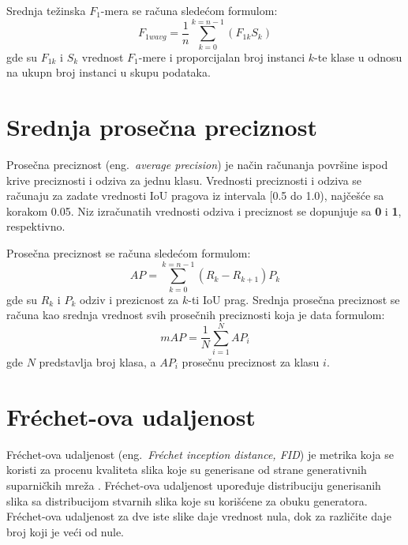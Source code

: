 \documentclass[12pt,oneside]{memoir}
\begin{document}
Srednja težinska $F_1$-mera se računa sledećom formulom:
\begin{equation}
\label{eq:f1wa}
    F_{1wavg} = \frac{1}{n}\sum_{k=0}^{k=n-1} (F_{1k} S_{k})
\end{equation}
gde su \(F_{1k}\) i \(S_{k}\) vrednost $F_1$-mere i proporcijalan broj instanci \(k\)-te klase u odnosu na ukupn broj instanci u skupu podataka.

\section{Srednja prosečna preciznost}
\label{section4_avgprecision}

Prosečna preciznost (eng.~\textit{average precision}) je način računanja površine ispod krive preciznosti i odziva za jednu klasu. Vrednosti preciznosti i odziva se računaju za zadate vrednosti IoU pragova iz intervala [0.5 do 1.0), najčešće sa korakom 0.05.
Niz izračunatih vrednosti odziva i preciznost se dopunjuje sa \textbf{0} i \textbf{1}, respektivno. 


Prosečna preciznost se računa sledećom formulom:
\begin{equation}
\label{eq:ap}
    AP = \sum_{k=0}^{k=n-1} (R_{k} - R_{k+1})P_{k}
\end{equation}
gde su \(R_{k}\) i \(P_{k}\) odziv i prezicnost za \(k\)-ti IoU prag.
Srednja prosečna preciznost se računa kao srednja vrednost svih prosečnih preciznosti koja je data formulom:
\begin{equation}
\label{eq:map}
    mAP =\frac{1}{N} \sum_{i=1}^{N} AP_{i}
\end{equation}
gde \(N\) predstavlja broj klasa, a \(AP_{i}\) prosečnu preciznost za klasu 
\(i\).

\section{Fréchet-ova udaljenost}

Fréchet-ova udaljenost (eng.~\textit{Fréchet inception distance, FID}) je metrika koja se koristi za procenu kvaliteta slika koje su generisane od strane generativnih suparničkih mreža \cite{heusel2017gans}. Fréchet-ova udaljenost upoređuje distribuciju generisanih slika sa distribucijom stvarnih slika koje su korišćene za obuku generatora. Fréchet-ova udaljenost za dve iste slike daje vrednost nula, dok za različite daje broj koji je veći od nule.  
\end{document}
